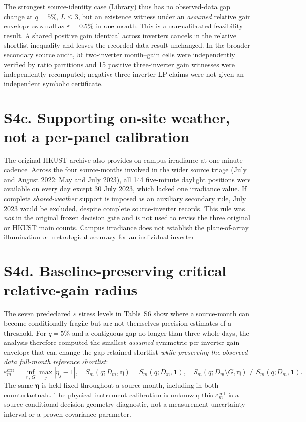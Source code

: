 \documentclass[11pt]{article}
\begin{document}
The strongest source-identity case (Library) thus has no observed-data gap change at $q=5\%$, $L\leq3$, but an existence witness under an \emph{assumed} relative gain envelope as small as $\varepsilon=0.5\%$ in one month. This is a non-calibrated feasibility result. A shared positive gain identical across inverters cancels in the relative shortlist inequality and leaves the recorded-data result unchanged. In the broader secondary source audit, 56 two-inverter month--gain cells were independently verified by ratio partitions and 15 positive three-inverter gain witnesses were independently recomputed; negative three-inverter LP claims were not given an independent symbolic certificate.

\section*{S4c. Supporting on-site weather, not a per-panel calibration}
The original HKUST archive also provides on-campus irradiance at one-minute cadence. Across the four source-months involved in the wider source triage (July and August 2022; May and July 2023), all 144 five-minute daylight positions were available on every day except 30 July 2023, which lacked one irradiance value. If complete \emph{shared-weather} support is imposed as an auxiliary secondary rule, July 2023 would be excluded, despite complete source-inverter records. This rule was \emph{not} in the original frozen decision gate and is not used to revise the three original or HKUST main counts. Campus irradiance does not establish the plane-of-array illumination or metrological accuracy for an individual inverter.

\section*{S4d. Baseline-preserving critical relative-gain radius}
The seven predeclared $\varepsilon$ stress levels in Table~S6 show where a source-month can become conditionally fragile but are not themselves precision estimates of a threshold. For $q=5\%$ and a contiguous gap no longer than three whole days, the analysis therefore computed the smallest \emph{assumed} symmetric per-inverter gain envelope that can change the gap-retained shortlist \emph{while preserving the observed-data full-month reference shortlist}:
\[
\varepsilon_m^{\mathrm{crit}}=\inf_{\boldsymbol{\eta},\,G}
\max_j |\eta_j-1|,\quad
S_m(q;D_m,\boldsymbol{\eta})=S_m(q;D_m,\mathbf{1}),
\quad
S_m(q;D_m\setminus G,\boldsymbol{\eta})\ne S_m(q;D_m,\mathbf{1}).
\]
The same $\boldsymbol{\eta}$ is held fixed throughout a source-month, including in both counterfactuals. The physical instrument calibration is unknown; this $\varepsilon_m^{\mathrm{crit}}$ is a source-conditional decision-geometry diagnostic, not a measurement uncertainty interval or a proven covariance parameter.
\end{document}
